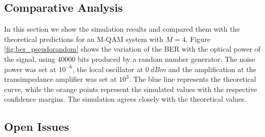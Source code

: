 \subsection{Comparative Analysis}

In this section we show the simulation results and compared them with the theoretical predictions for an M-QAM system with $M=4$. Figure \ref{fig:ber_pseudorandom} shows the variation of the BER with the optical power of the signal, using $40000$ bits produced by a random number generator. The noise power was set at $10^{-6}$, the local oscillator at $0~dBm$ and the amplification at the transimpedance amplifier was set at $10^3$.
The blue line represents the theoretical curve, while the orange points represent the simulated values with the respective confidence margins. The simulation agrees closely with the theoretical values.





\subsection{Open Issues}

\newpage



\renewcommand{\bibname}{References}
%


%
%


\cleardoublepage
